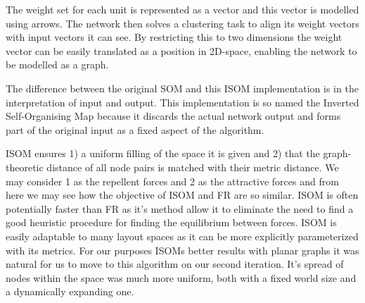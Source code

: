 \documentclass[11pt, a4paper]{report}
\begin{document}
The weight set for each unit is represented as a vector and this vector is modelled using arrows. The network then solves a clustering task to align its weight vectors with input vectors it can see. By restricting this to two dimensions the weight vector can be easily translated as a position in 2D-space, enabling the network to be modelled as a graph. 

The difference between the original SOM and this ISOM implementation is in the interpretation of input and output. This implementation is so named the Inverted Self-Organising Map because it discards the actual network output and forms part of the original input as a fixed aspect of the algorithm.

ISOM ensures 1) a uniform filling of the space it is given and 2) that the graph-theoretic distance of all node pairs is matched with their metric distance. We may consider 1 as the repellent forces and 2 as the attractive forces and from here we may see how the objective of ISOM and FR are so similar. ISOM is often potentially faster than FR as it’s method allow it to eliminate the need to find a good heuristic procedure for finding the equilibrium between forces. ISOM is easily adaptable to many layout spaces as it can be more explicitly parameterized with its metrics. For our purposes ISOMs better results with planar graphs it was natural for us to move to this algorithm on our second iteration. It’s spread of nodes within the space was much more uniform, both with a fixed world size and a dynamically expanding one.
\end{document}
